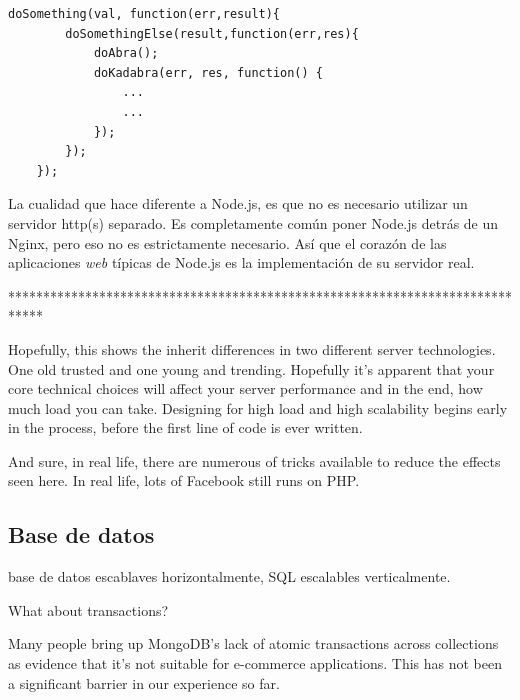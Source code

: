 \medskip
\begin{lstlisting}[caption= Ejemplo de anidación de funciones.]
	doSomething(val, function(err,result){
		doSomethingElse(result,function(err,res){
			doAbra();
			doKadabra(err, res, function() {
				...
				...
			});
		});
	});
\end{lstlisting}


La cualidad que hace diferente a Node.js, es que no es necesario utilizar un servidor http(s) separado. Es completamente común poner Node.js detrás de un Nginx, pero eso no es estrictamente necesario. Así que el corazón de las aplicaciones \textit{web} típicas de Node.js  es la implementación de su servidor real.


*****************************************************************************


Hopefully, this shows the inherit differences in two different server technologies. One old trusted and one young and trending. Hopefully it’s apparent that your core technical choices will affect your server performance and in the end, how much load you can take. Designing for high load and high scalability begins early in the process, before the first line of code is ever written.

And sure, in real life, there are numerous of tricks available to reduce the effects seen here. In real life, lots of Facebook still runs on PHP.


\subsection{Base de datos}


base de datos escablaves horizontalmente, SQL escalables verticalmente.




What about transactions?


Many people bring up MongoDB’s lack of atomic transactions across collections as evidence that it’s not suitable for e-commerce applications. This has not been a significant barrier in our experience so far.

